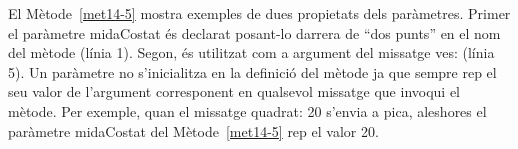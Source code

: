 El Mètode~\ref{met14-5} mostra exemples de dues propietats dels paràmetres. Primer el paràmetre \textsf{midaCostat} és declarat posant-lo darrera de ``dos punts'' en el nom del mètode (línia 1). Segon, és utilitzat com a argument del missatge \textsf{ves:} (línia 5). Un paràmetre no s'inicialitza en la definició del mètode ja que sempre rep el seu valor de l'argument corresponent en qualsevol missatge que invoqui el mètode. Per exemple, quan el missatge \textsf{quadrat: 20} s'envia a \textsf{pica}, aleshores el paràmetre \textsf{midaCostat} del Mètode~\ref{met14-5} rep el valor \textsf{20}. 


